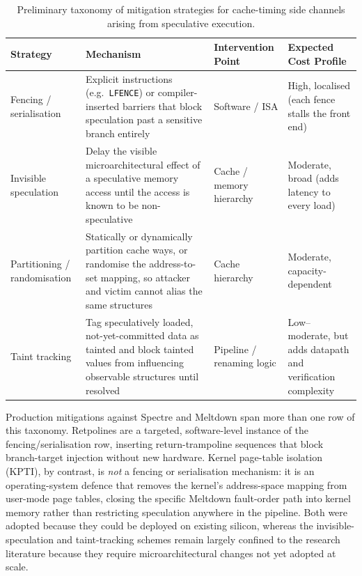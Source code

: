 \documentclass[11pt,a4paper]{article}
\begin{document}
\begin{table}[h]
\centering
\begin{tabular}{@{}p{2.6cm}p{5.2cm}p{2cm}p{3.4cm}@{}}
\toprule
\textbf{Strategy} & \textbf{Mechanism} & \textbf{Intervention Point} & \textbf{Expected Cost Profile} \\
\midrule
Fencing / serialisation & Explicit instructions (e.g.\ \texttt{LFENCE}) or compiler-inserted barriers that block speculation past a sensitive branch entirely & Software / ISA & High, localised (each fence stalls the front end) \\
\addlinespace
Invisible speculation & Delay the visible microarchitectural effect of a speculative memory access until the access is known to be non-speculative & Cache / memory hierarchy & Moderate, broad (adds latency to every load) \\
\addlinespace
Partitioning / randomisation & Statically or dynamically partition cache ways, or randomise the address-to-set mapping, so attacker and victim cannot alias the same structures & Cache hierarchy & Moderate, capacity-dependent \\
\addlinespace
Taint tracking & Tag speculatively loaded, not-yet-committed data as tainted and block tainted values from influencing observable structures until resolved & Pipeline / renaming logic & Low--moderate, but adds datapath and verification complexity \\
\bottomrule
\end{tabular}
\caption{Preliminary taxonomy of mitigation strategies for cache-timing side
channels arising from speculative execution.}
\label{tab:taxonomy}
\end{table}

Production mitigations against Spectre and Meltdown span more than one row of
this taxonomy. Retpolines are a targeted, software-level instance of the
fencing/serialisation row, inserting return-trampoline sequences that block
branch-target injection without new hardware. Kernel page-table isolation
(KPTI), by contrast, is \emph{not} a fencing or serialisation mechanism: it is
an operating-system defence that removes the kernel's address-space mapping from
user-mode page tables, closing the specific Meltdown fault-order path into kernel
memory rather than restricting speculation anywhere in the pipeline. Both were
adopted because they could be deployed on existing silicon, whereas the
invisible-speculation and taint-tracking schemes remain largely confined to the
research literature because they require microarchitectural changes not yet
adopted at scale.
\end{document}

